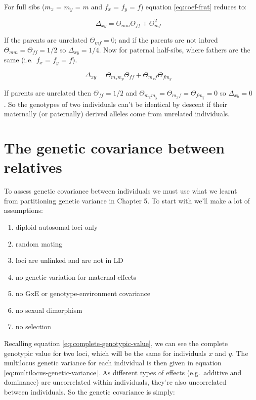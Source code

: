 \documentclass[
]{book}
\providecommand{\tightlist}{%
  \setlength{\itemsep}{0pt}\setlength{\parskip}{0pt}}
\begin{document}
For full sibs (\(m_x\) = \(m_y\) = \(m\) and \(f_x\) = \(f_y\) = \(f\)) equation \eqref{eq:coef-frat} reduces to:

\begin{equation}
  \Delta_{xy} = \Theta_{mm}\Theta_{ff} + \Theta^2_{mf}
  \label{eq:coef-frat-full-sibs}
\end{equation}

If the parents are unrelated \(\Theta_{mf} = 0\); and if the parents are not inbred \(\Theta_{mm} = \Theta_{ff} = 1/2\) so \(\Delta_{xy} = 1/4\). Now for paternal half-sibs, where fathers are the same (i.e.~\(f_x\) = \(f_y\) = \(f\)).

\begin{equation}
  \Delta_{xy} = \Theta_{m_{x}m_{y}}\Theta_{ff} + \Theta_{m_{x}f}\Theta_{fm_{y}}
  \label{eq:coef-frat-half-sibs}
\end{equation}

If parents are unrelated then \(\Theta_{ff} = 1/2\) and \(\Theta_{m_{x}m_{y}} = \Theta_{m_{x}f} = \Theta_{fm_{y}} = 0\) so \(\Delta_{xy} = 0\). So the genotypes of two individuals can't be identical by descent if their maternally (or paternally) derived alleles come from unrelated individuals.

\hypertarget{the-genetic-covariance-between-relatives}{%
\section{The genetic covariance between relatives}\label{the-genetic-covariance-between-relatives}}

To assess genetic covariance between individuals we must use what we learnt from partitioning genetic variance in Chapter 5. To start with we'll make a lot of assumptions:

\begin{enumerate}
\def\labelenumi{\arabic{enumi}.}
\tightlist
\item
  diploid autosomal loci only
\item
  random mating
\item
  loci are unlinked and are not in LD
\item
  no genetic variation for maternal effects
\item
  no GxE or genotype-environment covariance
\item
  no sexual dimorphism
\item
  no selection
\end{enumerate}

Recalling equation \eqref{eq:complete-genotypic-value}, we can see the complete genotypic value for two loci, which will be the same for individuals \(x\) and \(y\). The multilocus genetic variance for each individual is then given in equation \eqref{eq:multilocus-genetic-variance}. As different types of effects (e.g.~additive and dominance) are uncorrelated within individuals, they're also uncorrelated between individuals. So the genetic covariance is simply:
\end{document}
